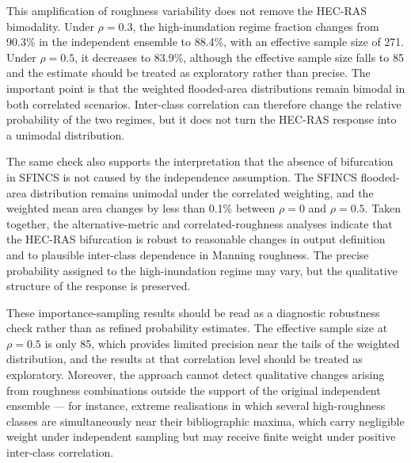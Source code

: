 \documentclass[a4paper,fleqn]{cas-sc}
\newcommand{\sfincs}{\textsc{SFINCS}}
\newcommand{\hecras}{\textsc{HEC-RAS}}
\begin{document}
This amplification of roughness variability does not remove the \hecras{} bimodality. Under $\rho=0.3$, the high-inundation regime fraction changes from 90.3\% in the independent ensemble to 88.4\%, with an effective sample size of 271. Under $\rho=0.5$, it decreases to 83.9\%, although the effective sample size falls to 85 and the estimate should be treated as exploratory rather than precise. The important point is that the weighted flooded-area distributions remain bimodal in both correlated scenarios. Inter-class correlation can therefore change the relative probability of the two regimes, but it does not turn the \hecras{} response into a unimodal distribution.

The same check also supports the interpretation that the absence of bifurcation in \sfincs{} is not caused by the independence assumption. The \sfincs{} flooded-area distribution remains unimodal under the correlated weighting, and the weighted mean area changes by less than 0.1\% between $\rho=0$ and $\rho=0.5$. Taken together, the alternative-metric and correlated-roughness analyses indicate that the \hecras{} bifurcation is robust to reasonable changes in output definition and to plausible inter-class dependence in Manning roughness. The precise probability assigned to the high-inundation regime may vary, but the qualitative structure of the response is preserved.

These importance-sampling results should be read as a diagnostic robustness check rather than as refined probability estimates. The effective sample size at $\rho = 0.5$ is only 85, which provides limited precision near the tails of the weighted distribution, and the results at that correlation level should be treated as exploratory. Moreover, the approach cannot detect qualitative changes arising from roughness combinations outside the support of the original independent ensemble --- for instance, extreme realisations in which several high-roughness classes are simultaneously near their bibliographic maxima, which carry negligible weight under independent sampling but may receive finite weight under positive inter-class correlation.
\end{document}

